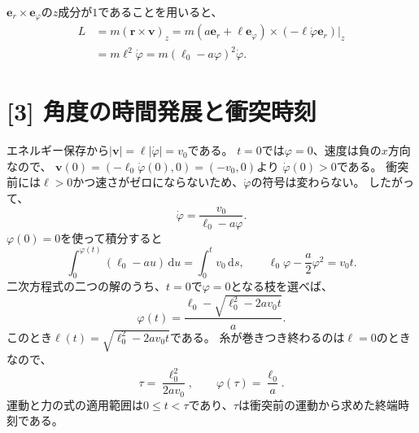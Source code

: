 \documentclass[11pt,a4paper]{article}
\begin{document}
$\boldsymbol{e}_r\times\boldsymbol{e}_{\varphi}$の$z$成分が$1$であることを用いると、
\begin{align}
  L&=m(\boldsymbol{r}\times\boldsymbol{v})_z
   =m(a\boldsymbol{e}_r+\ell\boldsymbol{e}_{\varphi})
      \times(-\ell\dot\varphi\boldsymbol{e}_r)\big|_z\\
   &=\boxed{m\ell^2\dot\varphi
      =m(\ell_0-a\varphi)^2\dot\varphi.}
\end{align}

\section*{[3] 角度の時間発展と衝突時刻}
エネルギー保存から$|\boldsymbol{v}|=\ell|\dot\varphi|=v_0$である。
$t=0$では$\varphi=0$、速度は負の$x$方向なので、
$\boldsymbol{v}(0)=(-\ell_0\dot\varphi(0),0)=(-v_0,0)$より
$\dot\varphi(0)>0$である。
衝突前には$\ell>0$かつ速さがゼロにならないため、$\dot\varphi$の符号は変わらない。
したがって、
\begin{equation}
  \dot\varphi=\frac{v_0}{\ell_0-a\varphi}.
\end{equation}
$\varphi(0)=0$を使って積分すると
\begin{equation}
  \int_0^{\varphi(t)}(\ell_0-a u)\,\mathrm{d}u
  =\int_0^t v_0\,\mathrm{d}s,\qquad
  \ell_0\varphi-\frac{a}{2}\varphi^2=v_0t.
\end{equation}
二次方程式の二つの解のうち、$t=0$で$\varphi=0$となる枝を選べば、
\begin{equation}
  \boxed{\varphi(t)=\frac{\ell_0-\sqrt{\ell_0^2-2av_0t}}{a}.}
  \label{eq:phi}
\end{equation}
このとき$\ell(t)=\sqrt{\ell_0^2-2av_0t}$である。
糸が巻きつき終わるのは$\ell=0$のときなので、
\begin{equation}
  \boxed{\tau=\frac{\ell_0^2}{2av_0},\qquad
  \varphi(\tau)=\frac{\ell_0}{a}.}
\end{equation}
運動と力の式の適用範囲は$0\le t<\tau$であり、$\tau$は衝突前の運動から求めた終端時刻である。
\end{document}
